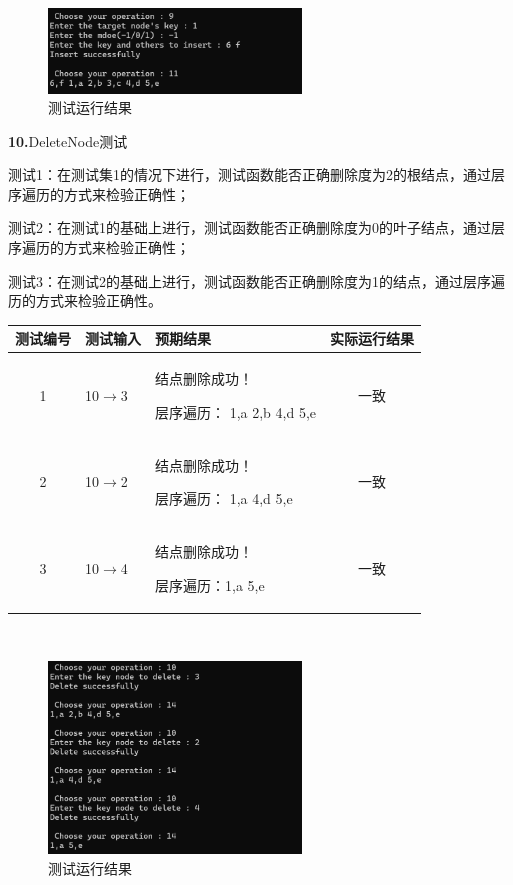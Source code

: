 \documentclass[supercite]{Experimental_Report}
\theoremstyle{definition}
\begin{document}
~\

\begin{figure}[H]
 	\centering
 	\includegraphics[width=0.6\textwidth]{images/二叉树测试9.png}
 	\caption{测试运行结果}
 	\label{txlab}
 \end{figure}

\noindent\textbf{10.}DeleteNode测试

测试1：在测试集1的情况下进行，测试函数能否正确删除度为2的根结点，通过层序遍历的方式来检验正确性；

测试2：在测试1的基础上进行，测试函数能否正确删除度为0的叶子结点，通过层序遍历的方式来检验正确性；

测试3：在测试2的基础上进行，测试函数能否正确删除度为1的结点，通过层序遍历的方式来检验正确性。

\vspace{0.5em}

\begin{tabular}{|c|l|l|c|}
	\hline
	测试编号 & 测试输入 & 预期结果 & 实际运行结果 \\
	\hline
	1 & 10$\rightarrow$3& 结点删除成功！

层序遍历： 1,a 2,b 4,d 5,e & 一致 \\
	\hline
	2 & 10$\rightarrow$2& 结点删除成功！

层序遍历： 1,a 4,d 5,e & 一致 \\
	\hline
	3 & 10$\rightarrow$4 & 结点删除成功！

层序遍历：1,a 5,e & 一致 \\
	\hline
\end{tabular}

~\

\begin{figure}[H]
 	\centering
 	\includegraphics[width=0.6\textwidth]{images/二叉树测试10.png}
 	\caption{测试运行结果}
 	\label{txlab}
 \end{figure}
\end{document}
